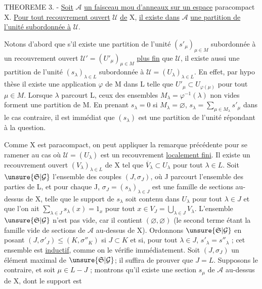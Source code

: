 THEOREME 3. - \uline{Soit} $\mathcal A$ \uline{un faisceau mou d'anneaux sur un espace} paracompact X. \uline{Pour tout recouvrement ouvert} $\mathcal U$ \uline{de} X, \uline{il existe dans} $\mathcal A$ \uline{une partition de l'unité subordonnée à} $\mathcal U$.

Notons d'abord que s'il existe une partition de l'unité $(s'_\mu)_{\mu\in M}$ subordonnée à un recouvrement ouvert $\mathcal U'=(U'_\mu)_{\mu\in M}$ \uline{plus fin} que $\mathcal U$, il existe aussi une partition de l'unité $(s_\lambda)_{\lambda\in L}$ subordonnée à $\mathcal U=(U_\lambda)_{\lambda\in L}$. En effet, par hypo thèse il existe une application $\varphi$ de M dans L telle que $U'_\mu\subset U_{\varphi(\mu)}$ pour tout $\mu\in M$. Lorsque $\lambda$ parcourt L, ceux des ensembles $M_\lambda=\varphi^{-1}(\lambda)$ non vides forment une partition de M. En prenant $s_\lambda=0$ si $M_\lambda=\varnothing$, $s_\lambda=\sum_{\mu\in M_\lambda}s'_\mu$ dans le cas contraire, il est immédiat que $(s_\lambda)$ est une partition de l'unité répondant à la question.

Comme X est paracompact, on peut appliquer la remarque précédente pour se ramener au cas où $\mathcal U=(U_\lambda)$ est un recouvrement \uline{localement fini}. Il existe un recouvrement ouvert $(V_\lambda)_{\lambda\in L}$ de X tel que $\overline V_\lambda\subset U_\lambda$ pour tout $\lambda\in L$. Soit $\unsure{\mathfrak S|\mathcal G}$ l'ensemble des couples $(J,\sigma_J)$, où J parcourt l'ensemble des parties de L, et pour chaque J, $\sigma_J=(s_\lambda)_{\lambda\in J}$ est une famille de sections au-dessus de X, telle que le support de $s_\lambda$ soit contenu dans $U_\lambda$ pour tout $\lambda\in J$ et que l'on ait $\sum_{\lambda\in J}s_\lambda(x)=1_x$ pour tout $x\in V_J=\bigcup_{\lambda\in J}V_\lambda$. L'ensemble $\unsure{\mathfrak S|\mathcal G}$ n'est pas vide, car il contient $(\varnothing,\varnothing)$ (le second terme étant la famille vide de sections de $\mathcal A$ au-dessus de X). Ordonnons $\unsure{\mathfrak S|\mathcal G}$ en posant $(J,\sigma'_J)\leq(K,\sigma''_K)$ si $J\subset K$ et si, pour tout $\lambda\in J$, $s'_\lambda=s''_\lambda$ ; cet ensemble est \uline{inductif}, comme on le vérifie immédiatement. Soit $(J,\sigma_J)$ un élément maximal de $\unsure{\mathfrak S|\mathcal G}$; il suffira de prouver que $J=L$. Supposons le contraire, et soit $\mu\in L-J$ ; montrons qu'il existe une section $s_\mu$ de $\mathcal A$ au-dessus de X, dont le support est

